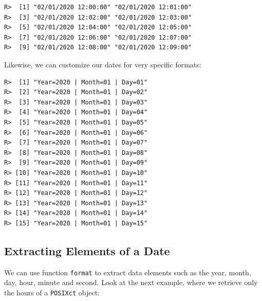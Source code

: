 \documentclass[
  12pt,
]{book}
\newenvironment{Shaded}{\begin{snugshade}}{\end{snugshade}}
\newcommand{\CommentTok}[1]{\textcolor[rgb]{0.37,0.37,0.37}{\textit{#1}}}
\newcommand{\KeywordTok}[1]{\textcolor[rgb]{0.27,0.27,0.27}{\textbf{#1}}}
\newcommand{\NormalTok}[1]{#1}
\newcommand{\StringTok}[1]{\textcolor[rgb]{0.5,0.5,0.5}{#1}}
\begin{document}
\begin{verbatim}
R>  [1] "02/01/2020 12:00:00" "02/01/2020 12:01:00"
R>  [3] "02/01/2020 12:02:00" "02/01/2020 12:03:00"
R>  [5] "02/01/2020 12:04:00" "02/01/2020 12:05:00"
R>  [7] "02/01/2020 12:06:00" "02/01/2020 12:07:00"
R>  [9] "02/01/2020 12:08:00" "02/01/2020 12:09:00"
\end{verbatim}

Likewise, we can customize our dates for very specific formats:

\begin{Shaded}
\end{Shaded}

\begin{verbatim}
R>  [1] "Year=2020 | Month=01 | Day=01"
R>  [2] "Year=2020 | Month=01 | Day=02"
R>  [3] "Year=2020 | Month=01 | Day=03"
R>  [4] "Year=2020 | Month=01 | Day=04"
R>  [5] "Year=2020 | Month=01 | Day=05"
R>  [6] "Year=2020 | Month=01 | Day=06"
R>  [7] "Year=2020 | Month=01 | Day=07"
R>  [8] "Year=2020 | Month=01 | Day=08"
R>  [9] "Year=2020 | Month=01 | Day=09"
R> [10] "Year=2020 | Month=01 | Day=10"
R> [11] "Year=2020 | Month=01 | Day=11"
R> [12] "Year=2020 | Month=01 | Day=12"
R> [13] "Year=2020 | Month=01 | Day=13"
R> [14] "Year=2020 | Month=01 | Day=14"
R> [15] "Year=2020 | Month=01 | Day=15"
\end{verbatim}

\hypertarget{extracting-elements-of-a-date}{%
\subsection{Extracting Elements of a Date}\label{extracting-elements-of-a-date}}

We can use function \texttt{format} to extract data elements such as the year, month, day, hour, minute and second. Look at the next example, where we retrieve only the hours of a \texttt{POSIXct} object: 
\end{document}
